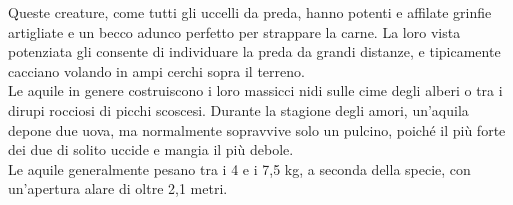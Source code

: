 \begin{multicols}{2}
Queste creature, come tutti gli uccelli da preda, hanno potenti e affilate grinfie artigliate e un becco adunco perfetto per strappare la carne. La loro vista potenziata gli consente di individuare la preda da grandi distanze, e tipicamente cacciano volando in ampi cerchi sopra il terreno.\\

Le aquile in genere costruiscono i loro massicci nidi sulle cime degli alberi o tra i dirupi rocciosi di picchi scoscesi. Durante la stagione degli amori, un'aquila depone due uova, ma normalmente sopravvive solo un pulcino, poiché il più forte dei due di solito uccide e mangia il più debole.\\

Le aquile generalmente pesano tra i 4 e i 7,5 kg, a seconda della specie, con un'apertura alare di oltre 2,1 metri.\\


\end{multicols}
